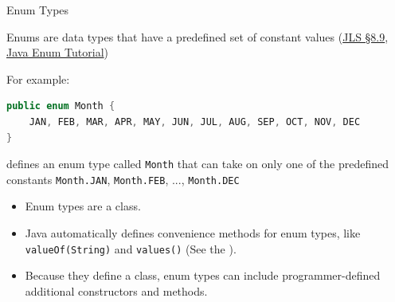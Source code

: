 \documentclass{beamer}
\begin{document}
\begin{frame}[fragile]{Enum Types}


Enums are data types that have a predefined set of constant values (\href{http://docs.oracle.com/javase/specs/jls/se7/html/jls-8.html#jls-8.9}{JLS \S 8.9}, \href{http://docs.oracle.com/javase/tutorial/java/javaOO/enum.html}{Java Enum Tutorial})

For example:
\begin{lstlisting}[language=Java]
public enum Month {
    JAN, FEB, MAR, APR, MAY, JUN, JUL, AUG, SEP, OCT, NOV, DEC
}
\end{lstlisting}
defines an enum type called {\tt Month} that can take on only one of the predefined constants {\tt Month.JAN}, {\tt Month.FEB}, ..., {\tt Month.DEC}

\begin{itemize}
\item Enum types are a class.
\item Java automatically defines convenience methods for enum types, like {\tt valueOf(String)} and {\tt values()} (See the ).
\item Because they define a class, enum types can include programmer-defined additional constructors and methods.
\end{itemize}

\end{frame}
\end{document}
